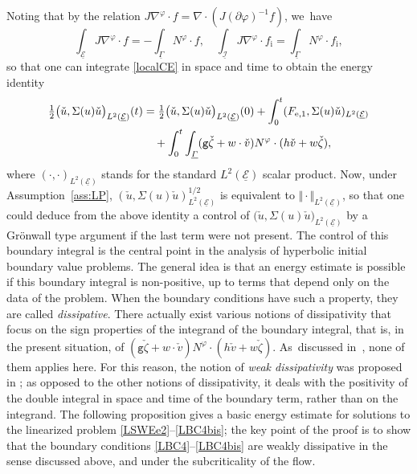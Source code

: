 \documentclass[JEP,XML,SOM,Unicode,NoFloatCountersInSection,published]{cedram}
\newcommand{\gr}{{\mathtt g}}
\newcommand{\cI}{{\mathcal I}}
\newcommand{\cE}{{\mathcal E}}
\newcommand{\ul}[1]{\underline{#1}}
\newcommand{\itGamma}{\mathit{\Gamma}}
\theoremstyle{definition}
\begin{document}
Noting that by the relation $J\nabla^\varphi\cdot f=\nabla\cdot(J(\partial\varphi)^{-1}f)$, we~have
\begin{equation}\label{DivTh}
\int_{\ul{\cE}}J\nabla^\varphi\cdot f = -\int_{\ul{\itGamma}}N^\varphi\cdot f, \quad
\int_{\ul{\cI}}J\nabla^\varphi\cdot f_\mathrm{i} = \int_{\ul{\itGamma}}N^\varphi\cdot f_\mathrm{i},
\end{equation}
so that one can integrate \eqref{localCE} in space and time to obtain the energy identity
\begin{align}\label{weakdissip0}
\tfrac{1}{2} \big(\check{u},\Sigma(u)\check{u}\big)_{L^2(\ul{\cE})}(t)
&= \tfrac{1}{2} \big(\check{u},\Sigma(u)\check{u}\big)_{L^2(\ul{\cE})}(0)
+ \int_0^t (F_{{\rm e},1},\Sigma(u)\check{u})_{L^2(\ul{\cE})} \\
&\quad
+ \int_0^t \int_{\ul\itGamma} (\gr\check{\zeta}+w\cdot\check{v}) N^\varphi\cdot (h\check{v}+w\check{\zeta}), \nonumber
\end{align}
where $(\cdot,\cdot)_{L^2(\ul{\cE})}$ stands for the standard $L^2(\ul{\cE})$ scalar product.
Now, under Assumption~\ref{ass:LP}, $(\check{u},\Sigma(u)\check{u})_{L^2(\ul{\cE})}^{1/2}$ is equivalent to $\Vert \cdot \Vert_{L^2(\ul{\cE})}$,
so that one could deduce from the above identity a control of $\big(\check{u},\Sigma(u)\check{u}\big)_{L^2(\ul{\cE})}$ by a Grönwall type argument
if the last term were not present.
The control of this boundary integral is the central point in the analysis of hyperbolic initial boundary value problems.
The general idea is that an energy estimate is possible if this boundary integral is non-positive, up to terms that depend only on the data of the problem.
When the boundary conditions have such a property, they are called {\it dissipative}.
There actually exist various notions of dissipativity that focus on the sign properties of the integrand of the boundary integral, that is,
in the present situation, of $(\gr\check{\zeta}+w\cdot\check{v}) N^\varphi\cdot (h\check{v}+w\check{\zeta})$. As~discussed in~\cite{IguchiLannes2023}, none of them applies here.
For this reason, the notion of {\it weak dissipativity} was proposed in \cite{IguchiLannes2023}; as opposed to the other notions of dissipativity,
it deals with the positivity of the double integral in space and time of the boundary term, rather than on the integrand.
The following proposition gives a basic energy estimate for solutions to the linearized problem \eqref{LSWEe2}--\eqref{LBC4bis};
the key point of the proof is to show that the boundary conditions \eqref{LBC4}--\eqref{LBC4bis} are weakly dissipative in the sense discussed above,
and under the subcriticality of the flow.
\end{document}
